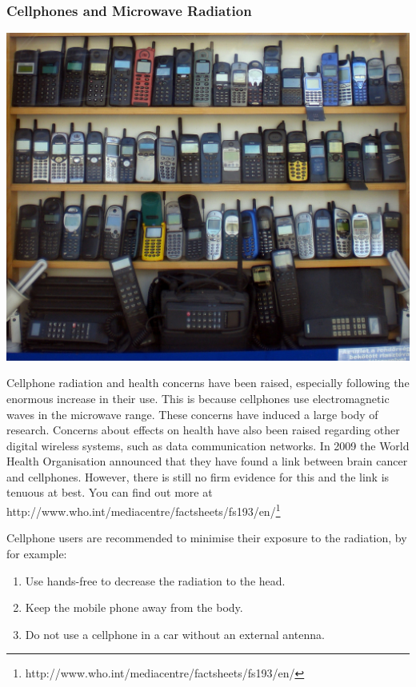             \subsubsection*{Cellphones and Microwave Radiation}
            \nopagebreak
\begin{minipage}{.5\textwidth}
\includegraphics[width=.8\columnwidth]{photos/cellphones_kapungo.jpg}
\end{minipage}
\begin{minipage}{.5\textwidth}
            \label{m38779*id189654}Cellphone radiation and health concerns have been raised, especially following the enormous increase in their use. This is because cellphones use electromagnetic waves in the microwave range. These concerns have induced a large body of research. Concerns about effects on health have also been raised regarding other digital wireless systems, such as data communication networks.
In 2009 the World Health Organisation announced that they have found a link between brain cancer and cellphones. However, there is still no firm evidence for this and the link is tenuous at best. You can find out more at http://www.who.int/mediacentre/factsheets/fs193/en/\footnote{http://www.who.int/mediacentre/factsheets/fs193/en/}
        \par 
\end{minipage}
        \label{m38779*id189664}Cellphone users are recommended to minimise their exposure to the radiation, by for example:\par 
        \label{m38779*id189668}\begin{enumerate}[noitemsep, label=\textbf{\arabic*}. ] 
            \label{m38779*uid24}\item Use hands-free to decrease the radiation to the head.
\label{m38779*uid25}\item Keep the mobile phone away from the body.
\label{m38779*uid26}\item Do not use a cellphone in a car without an external antenna.
\end{enumerate}
